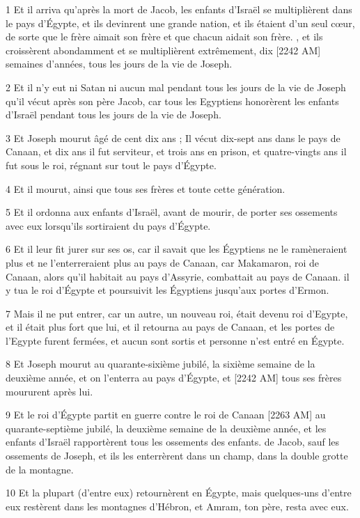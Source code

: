 \par 1 Et il arriva qu'après la mort de Jacob, les enfants d'Israël se multiplièrent dans le pays d'Égypte, et ils devinrent une grande nation, et ils étaient d'un seul cœur, de sorte que le frère aimait son frère et que chacun aidait son frère. , et ils croissèrent abondamment et se multiplièrent extrêmement, dix [2242 AM] semaines d'années, tous les jours de la vie de Joseph.
\par 2 Et il n'y eut ni Satan ni aucun mal pendant tous les jours de la vie de Joseph qu'il vécut après son père Jacob, car tous les Egyptiens honorèrent les enfants d'Israël pendant tous les jours de la vie de Joseph.
\par 3 Et Joseph mourut âgé de cent dix ans ; Il vécut dix-sept ans dans le pays de Canaan, et dix ans il fut serviteur, et trois ans en prison, et quatre-vingts ans il fut sous le roi, régnant sur tout le pays d'Égypte.
\par 4 Et il mourut, ainsi que tous ses frères et toute cette génération.
\par 5 Et il ordonna aux enfants d'Israël, avant de mourir, de porter ses ossements avec eux lorsqu'ils sortiraient du pays d'Égypte.
\par 6 Et il leur fit jurer sur ses os, car il savait que les Égyptiens ne le ramèneraient plus et ne l'enterreraient plus au pays de Canaan, car Makamaron, roi de Canaan, alors qu'il habitait au pays d'Assyrie, combattait au pays de Canaan. il y tua le roi d'Égypte et poursuivit les Égyptiens jusqu'aux portes d'Ermon.
\par 7 Mais il ne put entrer, car un autre, un nouveau roi, était devenu roi d'Egypte, et il était plus fort que lui, et il retourna au pays de Canaan, et les portes de l'Egypte furent fermées, et aucun sont sortis et personne n’est entré en Égypte.
\par 8 Et Joseph mourut au quarante-sixième jubilé, la sixième semaine de la deuxième année, et on l'enterra au pays d'Égypte, et [2242 AM] tous ses frères moururent après lui.
\par 9 Et le roi d'Égypte partit en guerre contre le roi de Canaan [2263 AM] au quarante-septième jubilé, la deuxième semaine de la deuxième année, et les enfants d'Israël rapportèrent tous les ossements des enfants. de Jacob, sauf les ossements de Joseph, et ils les enterrèrent dans un champ, dans la double grotte de la montagne.
\par 10 Et la plupart (d'entre eux) retournèrent en Égypte, mais quelques-uns d'entre eux restèrent dans les montagnes d'Hébron, et Amram, ton père, resta avec eux.
